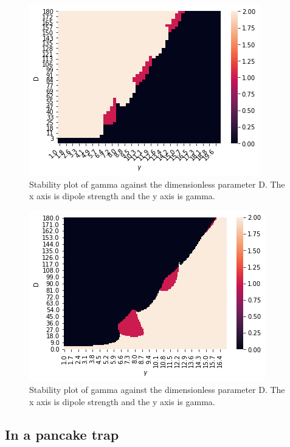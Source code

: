 \documentclass[10pt]{article}
\numberwithin{equation}{section}
\begin{document}
\begin{multicols}{2}
\begin{figure}[H]
\centering
\includegraphics[width=\linewidth]{stableplot1}
\caption{Stability plot of gamma against the dimensionless parameter D. The x axis is dipole strength and the y axis is gamma.}
\end{figure}

\begin{figure}[H]
\centering
\includegraphics[width=\linewidth]{best harmonic stability plot}
\caption{Stability plot of gamma against the dimensionless parameter D. The x axis is dipole strength and the y axis is gamma.}
\end{figure}

\subsection{In a pancake trap}


\end{multicols}
\end{document}
